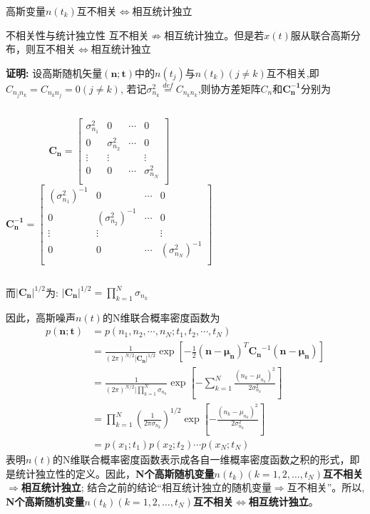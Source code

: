\begin{frame}{高斯变量$n(t_k)$互不相关$\Leftrightarrow$相互统计独立}
	\begin{block}{不相关性与统计独立性}
		互不相关$\nRightarrow$相互统计独立。但是若$x(t)$服从联合高斯分布，则互不相关$\Leftrightarrow$相互统计独立
	\end{block}
\textbf{证明:} 设高斯随机矢量$\bm{(n;t)}$中的$n(t_j)$与$n(t_k)(j\ne k)$互不相关,即$C_{n_jn_k}=C_{n_kn_j}=0(j\ne k)$, 若记$\sigma_{n_k}^2\mathop{=}\limits^{def}C_{n_kn_k}$,则协方差矩阵$C_n$和$\bm{C_n^{-1}}$分别为
	\begin{columns}
		$$
		\bm{C_n}=\left[
		\begin{matrix}
		\sigma_{n_1}^2 &  0                 & \cdots & 0\\
		0              &  \sigma_{n_2}^2  & \cdots & 0\\
		\vdots         &  \vdots            &        &\vdots \\
		0              &  0                 & \cdots &\sigma_{n_N}^2\\
		\end{matrix}
		\right]
		$$
		$$\bm{C_n^{-1}}=\left[
		\begin{matrix}
		(\sigma_{n_1}^2)^{-1} &  0                 & \cdots & 0\\
		0              &  (\sigma_{n_2}^2)^{-1}  & \cdots & 0\\
		\vdots         &  \vdots            &        &\vdots \\
		0              &  0                 & \cdots &(\sigma_{n_N}^2)^{-1}\\
		\end{matrix}
		\right]
		$$
	\end{columns}
	而$|\bm{C_n}|^{1/2}$为: $|\bm{C_n}|^{1/2}=\prod\limits_{k=1}^{N}\sigma_{n_k}$
\end{frame}

\begin{frame}
	因此，高斯噪声$n(t)$的N维联合概率密度函数为
	\begin{align*}
	p(\bm{n;t})&=p(n_1,n_2,\cdots,n_N; t_1,t_2,\cdots,t_N)\\
	&=\frac{1}{(2\pi)^{N/2}|\bm{C_n}|^{1/2}}\exp\left[-\frac{1}{2}(\bm{n-\mu_n})^T\bm{C_n}^{-1}(\bm{n-\mu_n})\right]\\
	&=\frac{1}{(2\pi)^{N/2}|\prod\limits_{k=1}^{N}\sigma_{n_k}}\exp\left[-\sum\limits_{k=1}^{N}\frac{(n_k-\mu_{n_k})^2}{2\sigma_{n_k}^2}\right]\\
	&=\prod\limits_{k=1}^{N}\left(\frac{1}{2\pi\sigma_{n_k}}\right)^{1/2}\exp\left[-\frac{(n_k-\mu_{n_k})^2}{2\sigma_{n_k}^2}\right]\\
	&=p(x_1;t_1)p(x_2;t_2)\cdots p(x_N;t_N)
	\end{align*}
	表明$n(t)$的N维联合概率密度函数表示成各自一维概率密度函数之积的形式，即是统计独立性的定义。因此，\textbf{N个高斯随机变量$n(t_k)(k=1,2,\dots,t_N)$互不相关$\Rightarrow$相互统计独立}; 结合之前的结论``相互统计独立的随机变量$\Rightarrow$互不相关''。所以, \textbf{
	N个高斯随机变量$n(t_k)(k=1,2,\dots,t_N)$互不相关$\Leftrightarrow$相互统计独立}。
\end{frame}

